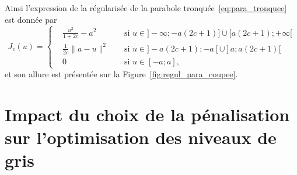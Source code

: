 \documentclass[main.tex]{subfiles}
\begin{document}
Ainsi l'expression de la régularisée de la parabole tronquée~\ref{eq:para_tronquee} est donnée par
\begin{equation}\label{eq:regul_parabole_coupee}
J_c(u) = \left\{  \begin{aligned}
&\frac{u^2}{1+2c}-a^2 && \textrm{ si } u\in ]-\infty;-a(2c+1)] \cup [a(2c+1);+\infty[  \\
&\frac{1}{2c}\|a-u\|^2 && \textrm{ si } u \in ]-a(2c+1);-a[ \cup ]a;a(2c+1) [ \\
&0 && \textrm{ si } u\in [-a;a],
\end{aligned}  \right.
\end{equation}
et son allure est présentée sur la Figure~\ref{fig:regul_para_coupee}.

\section{Impact du choix de la pénalisation sur l'optimisation des niveaux de gris} %
\end{document}
